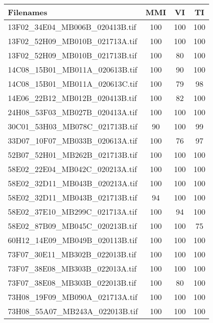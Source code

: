 \begin{tabular}{lccc}
\hline
 Filenames                                    & MMI & VI  & TI  \\ \hline \hline
 13F02\_34E04\_MB006B\_020413B.tif     & 100 & 100 & 100 \\
 13F02\_52H09\_MB010B\_021713A.tif & 100 & 100 & 100 \\
 13F02\_52H09\_MB010B\_021713B.tif     & 100 & 80  & 100 \\
 14C08\_15B01\_MB011A\_020613B.tif     & 100 & 90  & 100 \\
 14C08\_15B01\_MB011A\_020613C.tif     & 100 & 79  & 98  \\
 14E06\_22B12\_MB012B\_020413B.tif     & 100 & 82  & 100 \\
 24H08\_53F03\_MB027B\_020413A.tif     & 100 & 100 & 100 \\
 30C01\_53H03\_MB078C\_021713B.tif     & 90  & 100 & 99  \\
 33D07\_10F07\_MB033B\_020613A.tif     & 100 & 76  & 97  \\
 52B07\_52H01\_MB262B\_021713B.tif     & 100 & 100 & 100 \\
 58E02\_22E04\_MB042C\_020213A.tif     & 100 & 100 & 100 \\
 58E02\_32D11\_MB043B\_020213A.tif     & 100 & 100 & 100 \\
 58E02\_32D11\_MB043B\_021713B.tif     & 94  & 100 & 100 \\
 58E02\_37E10\_MB299C\_021713A.tif     & 100 & 94  & 100 \\
 58E02\_87B09\_MB045C\_020213B.tif     & 100 & 100 & 75  \\
 60H12\_14E09\_MB049B\_020113B.tif     & 100 & 100 & 100 \\
 73F07\_30E11\_MB302B\_022013B.tif     & 100 & 100 & 100 \\
 73F07\_38E08\_MB303B\_022013A.tif     & 100 & 100 & 100 \\
 73F07\_38E08\_MB303B\_022013B.tif     & 100 & 80  & 100 \\
 73H08\_19F09\_MB090A\_021713A.tif     & 100 & 100 & 100 \\
 73H08\_55A07\_MB243A\_022013B.tif     & 100 & 100 & 100 \\
\hline
\end{tabular}